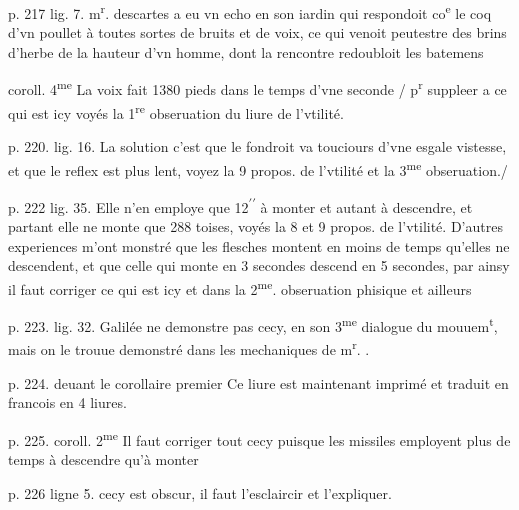 \documentclass[11pt,a4paper]{article}
\begin{document}
p. 217 lig. 7.
m\textsuperscript{r}. descartes a eu vn echo en son iardin qui respondoit co\textsuperscript{e} le coq d'vn poullet à toutes sortes de bruits et de voix, ce qui venoit peutestre des brins d'herbe de la hauteur d'vn homme, dont la rencontre redoubloit les batemens

coroll. 4\textsuperscript{me}
La voix fait 1380 pieds dans le temps d'vne seconde / p\textsuperscript{r} suppleer a ce qui est icy voyés la 1\textsuperscript{re} obseruation du liure de l'vtilité.

p. 220. lig. 16.
La solution  c'est que le fondroit va touciours d'vne esgale vistesse, et que le reflex est plus lent, voyez la 9 propos. de l'vtilité et la 3\textsuperscript{me} obseruation./

p. 222 lig. 35.
Elle n'en employe que 12\textsuperscript{$\prime\prime$} à monter et autant à descendre, et partant elle ne monte que 288 toises, voyés la 8 et 9 propos. de l'vtilité.
D'autres experiences m'ont monstré que les flesches montent en moins de temps qu'elles ne descendent, et que celle qui monte en 3 secondes descend en 5 secondes, par ainsy il faut corriger ce qui est icy et dans la 2\textsuperscript{me}. obseruation phisique et ailleurs

p. 223. lig. 32.
Galilée ne demonstre pas cecy, en son 3\textsuperscript{me} dialogue du mouuem\textsuperscript{t}, mais on le trouue demonstré dans les mechaniques de m\textsuperscript{r}. .

p. 224. deuant le corollaire premier
Ce liure est maintenant imprimé et traduit en francois en 4 liures.

p. 225. coroll. 2\textsuperscript{me}
Il faut corriger tout cecy puisque les missiles employent plus de temps à descendre qu'à monter

p. 226 ligne 5.
cecy est obscur, il faut l'esclaircir et l'expliquer.

\end{document}

